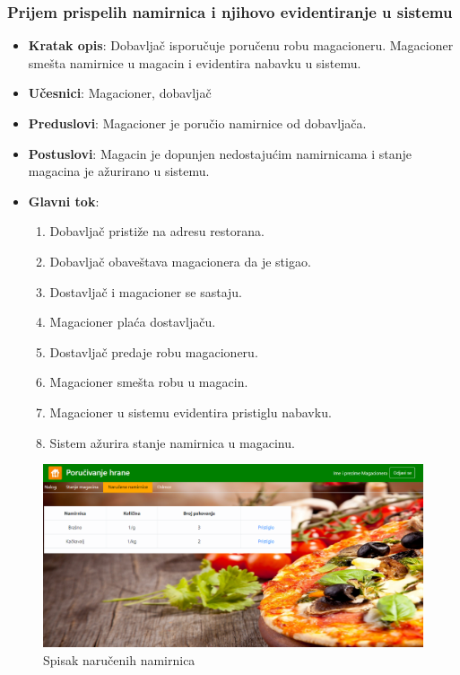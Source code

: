   \subsubsection{Prijem prispelih namirnica i njihovo evidentiranje u sistemu}
 \begin{itemize}
    \item \textbf{Kratak opis}:
   Dobavljač isporučuje poručenu robu magacioneru. Magacioner smešta namirnice u magacin i evidentira nabavku u sistemu.
    \item \textbf{Učesnici}:
    Magacioner, dobavljač
    \item \textbf{Preduslovi}:
    Magacioner je poručio namirnice od dobavljača.
    \item \textbf{Postuslovi}:
    Magacin je dopunjen nedostajućim namirnicama i stanje magacina je ažurirano u sistemu. 
    \item \textbf{Glavni tok}:
    \begin{enumerate}
        \item Dobavljač pristiže na adresu restorana.
        \item Dobavljač obaveštava magacionera da je stigao.
        \item Dostavljač i magacioner se sastaju.
        \item Magacioner plaća dostavljaču.
        \item Dostavljač predaje robu magacioneru.
        \item Magacioner smešta robu u magacin.
        \item Magacioner u sistemu evidentira pristiglu nabavku.
        \item Sistem ažurira stanje namirnica u magacinu.  
        
    \end{enumerate}

\end{itemize}

 \begin{figure}[!h]
    \leavevmode
    \begin{center}
    \includegraphics[width=1\textwidth]{slike/magacioner_vecNarucene.PNG}
    \end{center}
    \caption{Spisak naručenih namirnica} %
    \label{fig:slika_narucene}
\end{figure}
 
 
